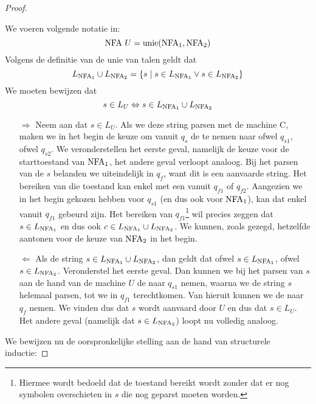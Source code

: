 \documentclass[../aanvullingen_cursus.tex]{subfiles}
\begin{document}
\begin{proof}
\begin{itemize}
		We voeren volgende notatie in: \[ \text{NFA } U = \operatorname*{unie}(\text{NFA}_{1},\text{NFA}_{2}) \] Volgens de definitie van de unie van talen geldt dat \[ L_{\text{NFA}_1} \cup L_{\text{NFA}_2}=\{s \mid s \in L_{\text{NFA}_1} \lor s \in L_{\text{NFA}_2}\} \] We moeten bewijzen dat \[ s \in L_{U} \Leftrightarrow s \in L_{\text{NFA}_1} \cup L_{\text{NFA}_2} \]
		\begin{enumerate}
			\item[\( \Rightarrow \)] Neem aan dat \( s \in L_U \). Als we deze string parsen met de machine C, maken we in het begin de keuze om vanuit \( q_s \) de \epsilonboog te nemen naar ofwel \( q_{s1} \), ofwel \( q_{s2} \). We veronderstellen het eerste geval, namelijk de keuze voor de starttoestand van \(\text{NFA}_1\), het andere geval verloopt analoog. Bij het parsen van de \( s \) belanden we uiteindelijk in \( q_f \), want dit is een aanvaarde string. Het bereiken van die toestand kan enkel met een \epsilonboog vanuit \( q_{f1} \) of \( q_{f2} \). Aangezien we in het begin gekozen hebben voor \( q_{s1} \) (en dus ook voor \( \text{NFA}_1 \)), kan dat enkel vanuit \( q_{f1} \) gebeurd zijn. Het bereiken van \(q_{f1}\)\footnote{Hiermee wordt bedoeld dat de toestand bereikt wordt zonder dat er nog symbolen overschieten in \( s \) die nog geparst moeten worden.} wil precies zeggen dat \(s \in L_{\text{NFA}_1}\) en dus ook \( c \in L_{\text{NFA}_1} \cup L_{\text{NFA}_2} \). We kunnen, zoals gezegd, hetzelfde aantonen voor de keuze van \( \text{NFA}_2 \) in het begin.
			\item[\(\Leftarrow\)] Als de string \( s \in L_{\text{NFA}_1} \cup L_{\text{NFA}_2} \), dan geldt dat ofwel \( s \in L_{\text{NFA}_1} \), ofwel \( s \in L_{\text{NFA}_2} \). Veronderstel het eerste geval. Dan kunnen we bij het parsen van \( s \) aan de hand van de machine \( U \) de \epsilonboog naar \(q_{s1}\) nemen, waarna we de string \(s\) helemaal parsen, tot we in \(q_{f1}\) terechtkomen. Van hieruit kunnen we de \epsilonboog naar \(q_f\) nemen. We vinden dus dat \(s\) wordt aanvaard door \(U\) en dus dat \(s \in L_U\). Het andere geval (namelijk dat \(s \in L_{\text{NFA}_2}\)) loopt nu volledig analoog.
		\end{enumerate}

	\end{itemize}

	We bewijzen nu de oorspronkelijke stelling aan de hand van structurele inductie:


\end{proof}
\end{document}
